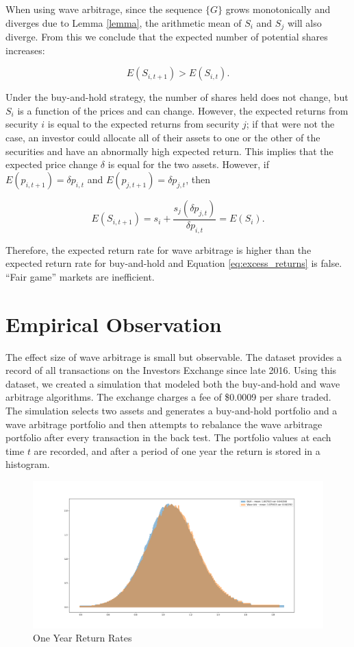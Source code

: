 \documentclass{article}
\begin{document}
When using wave arbitrage, since the sequence $\{G\}$ grows monotonically and
diverges due to Lemma \ref{lemma}, the arithmetic mean of $S_i$ and $S_j$ will
also diverge. From this we conclude that the expected number of potential
shares increases:

\begin{equation}
  E(S_{i,t+1}) > E(S_{i,t}).
\end{equation}

Under the buy-and-hold strategy, the number of shares held does not change, but
$S_i$ is a function of the prices and can change. However, the expected returns
from security $i$ is equal to the expected returns from security $j$; if that
were not the case, an investor could allocate all of their assets to one or the
other of the securities and have an abnormally high expected return. This
implies that the expected price change $\delta$ is equal for the two assets.
However, if $E (p_{i,t+1}) = \delta p_{i,t}$ and $E (p_{j,t+1}) = \delta
p_{j,t}$, then

\begin{equation}
  E (S_{i,t+1}) = s_i + \frac{s_j (\delta p_{j,t})}{\delta p_{i,t}} = E (S_{i}).
\end{equation}

Therefore, the expected return rate for wave arbitrage is higher than the
expected return rate for buy-and-hold and Equation \ref{eq:excess_returns} is
false. ``Fair game'' markets are inefficient.

\section{Empirical Observation}

The effect size of wave arbitrage is small but observable. The \citet{IEX}
dataset provides a record of all transactions on the Investors Exchange since
late 2016. Using this dataset, we created a simulation that modeled both the
buy-and-hold and wave arbitrage algorithms. The exchange charges a fee of
\$0.0009 per share traded. The simulation selects two assets and generates a
buy-and-hold portfolio and a wave arbitrage portfolio and then attempts to
rebalance the wave arbitrage portfolio after every transaction in the back
test. The portfolio values at each time $t$ are recorded, and after a period of
one year the return is stored in a histogram.

\begin{figure}[h!]
  \includegraphics[width=\linewidth]{OneYearReturnRates.png}
  \caption{One Year Return Rates}
  \label{fig}
\end{figure}
\end{document}
